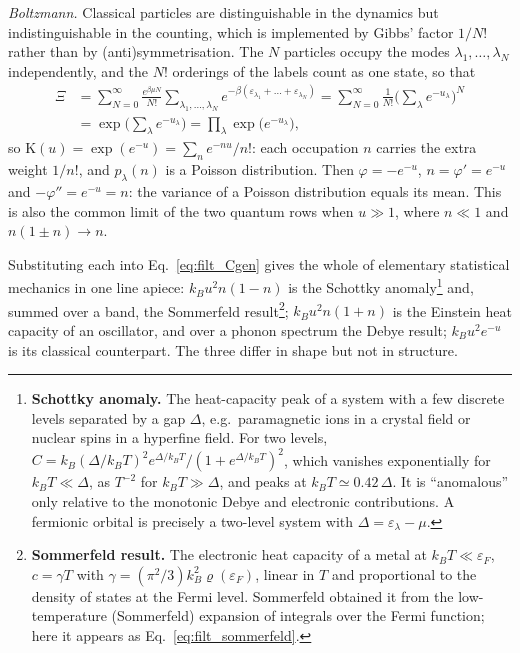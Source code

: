 \documentclass[10pt,a4paper]{article}
\theoremstyle{plain}
\theoremstyle{remark}
\providecommand{\Kappa}{\mathrm{K}}
\begin{document}
\emph{Boltzmann.} Classical particles are distinguishable in the dynamics but
indistinguishable in the counting, which is implemented by Gibbs' factor $ 1/N! $
rather than by (anti)symmetrisation. The $ N $ particles occupy the modes
$ \lambda_1,\dots,\lambda_N $ independently, and the $ N! $ orderings of the labels
count as one state, so that
\[
\begin{aligned}
  \Xi &= \sum_{N=0}^{\infty}\frac{e^{\beta\mu N}}{N!}\sum_{\lambda_1,\dots,\lambda_N}
  e^{-\beta(\varepsilon_{\lambda_1}+\dots+\varepsilon_{\lambda_N})}
  = \sum_{N=0}^{\infty}\frac{1}{N!}\Big(\sum_\lambda e^{-u_\lambda}\Big)^{N}
  \\
  &= \exp\Big(\sum_\lambda e^{-u_\lambda}\Big) = \prod_\lambda \exp\big(e^{-u_\lambda}\big) ,
\end{aligned}
\]
so $ \Kappa(u) = \exp(e^{-u}) = \sum_n e^{-nu}/n! $: each occupation $ n $ carries the
extra weight $ 1/n! $, and $ p_\lambda(n) $ is a Poisson distribution. Then
$ \varphi = -e^{-u} $, $ n = \varphi' = e^{-u} $ and $ -\varphi'' = e^{-u} = n $: the
variance of a Poisson distribution equals its mean. This is also the common
limit of the two quantum rows when $ u \gg 1 $, where $ n \ll 1 $ and
$ n(1 \pm n) \to n $.

Substituting each into Eq.~\eqref{eq:filt_Cgen} gives the whole of elementary
statistical mechanics in one line apiece: $k_Bu^{2}n(1-n)$ is
the Schottky anomaly\footnote{\textbf{Schottky anomaly.} The heat-capacity peak of a
system with a few discrete levels separated by a gap $ \Delta $, e.g.\ paramagnetic
ions in a crystal field or nuclear spins in a hyperfine field. For two levels,
$ C = k_B(\Delta/k_BT)^{2}e^{\Delta/k_BT}/(1 + e^{\Delta/k_BT})^{2} $, which vanishes
exponentially for $ k_BT \ll \Delta $, as $ T^{-2} $ for $ k_BT \gg \Delta $, and peaks
at $ k_BT \simeq 0.42\,\Delta $. It is ``anomalous'' only relative to the
monotonic Debye and electronic contributions. A fermionic orbital is precisely a
two-level system with $ \Delta = \varepsilon_\lambda - \mu $.} and, summed over a
band, the Sommerfeld result\footnote{\textbf{Sommerfeld result.} The electronic
heat capacity of a metal at $ k_BT \ll \varepsilon_F $, $ c = \gamma T $ with
$ \gamma = (\pi^{2}/3)k_B^{2}\varrho(\varepsilon_F) $, linear in $ T $ and proportional to
the density of states at the Fermi level. Sommerfeld obtained it from the
low-temperature (Sommerfeld) expansion of integrals over the Fermi function; here
it appears as Eq.~\eqref{eq:filt_sommerfeld}.};
$k_Bu^{2}n(1+n)$ is the Einstein heat capacity of an oscillator,
and over a phonon spectrum the Debye result;
$k_Bu^{2}e^{-u}$ is its classical counterpart. The three differ in shape
but not in structure.
\end{document}
